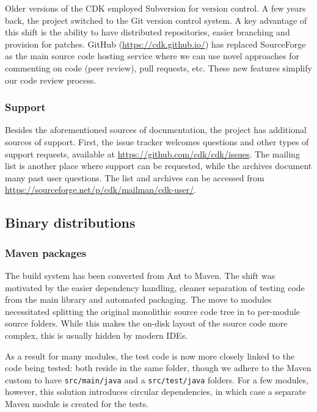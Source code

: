 \documentclass[doublespacing]{bmcart}
\begin{document}
Older versions of the CDK employed Subversion for version control. A
few years back, the project switched to the Git version control
system. A key advantage of this shift is the ability to have
distributed repositories, easier branching and provision for
patches. GitHub (\url{https://cdk.github.io/}) has replaced
SourceForge as the main source code hosting service where we can use
novel approaches for commenting on code (peer review), pull requests,
etc. These new features simplify our code review process.

\subsubsection*{Support}

Besides the aforementioned sources of documentation, the project has additional
sources of support. First, the issue tracker welcomes questions and other types
of support requests, available at \url{https://github.com/cdk/cdk/issues}.
The mailing list is another place where support can be requested, while the
archives document many past user questions. The list and archives can be
accessed from \url{https://sourceforge.net/p/cdk/mailman/cdk-user/}.

\subsection*{Binary distributions}

\subsubsection*{Maven packages}

The build system has been converted from Ant to Maven. The shift was
motivated by the easier dependency handling, cleaner separation of
testing code from the main library and automated packaging. The move
to modules necessitated splitting the original monolithic source code
tree in to per-module source folders. While this makes the on-disk
layout of the source code more complex, this is usually hidden by
modern IDEs.

As a result for many modules, the test code is now more closely linked
to the code being tested: both reside in the same folder, though we
adhere to the Maven custom to have \texttt{src/main/java} and a
\texttt{src/test/java} folders.  For a few modules, however, this
solution introduces circular dependencies, in which case a separate
Maven module is created for the tests.
\end{document}
